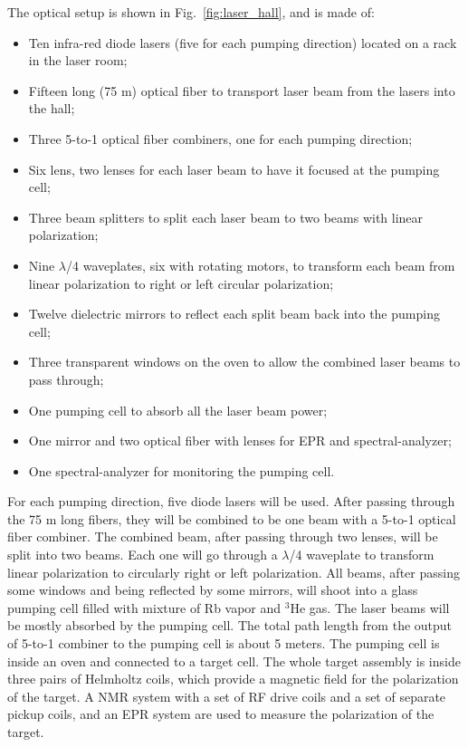 {The optical setup is shown in Fig.~\ref{fig:laser_hall}, and is made of:
\begin {itemize}
\item Ten infra-red diode lasers (five for each pumping direction) 
located on a rack in the laser room;
\item Fifteen long (75 m) optical fiber to transport laser beam from the lasers
into the hall;
\item Three 5-to-1 optical fiber combiners, one for each pumping direction;
\item Six lens, two lenses for each laser beam to have it focused at the 
pumping cell;
\item Three beam splitters to split each laser beam to two beams with linear polarization;
\item Nine $\lambda$/4 waveplates, six with rotating motors, to transform 
each beam from linear polarization to right or left circular polarization;
\item Twelve dielectric mirrors to reflect each split beam back into the pumping cell;
\item Three transparent windows 
on the oven to allow the combined laser beams to pass through;
\item One pumping cell to absorb all the laser beam power;
\item One mirror and two optical fiber with lenses for EPR and spectral-analyzer;
\item One spectral-analyzer for monitoring the pumping cell.
\end {itemize}

For each pumping direction, five diode lasers will be used. After passing through the 75 m long fibers, they will be combined
to be one beam with a 5-to-1 optical fiber combiner. The combined beam, after passing through two lenses,
will be split into two beams. Each one will go through a $\lambda$/4 waveplate
to transform linear polarization to circularly right or left polarization. 
All beams, after passing some windows and being reflected by some mirrors,  
will shoot into a glass pumping cell filled with
mixture of Rb vapor and $^3$He gas. The laser beams will be mostly absorbed
by the pumping cell. The total path length from the output of 5-to-1 combiner 
to the pumping cell
is about 5 meters. The pumping cell is inside an oven and 
connected to a target cell. The whole target assembly is inside three pairs of
Helmholtz coils, which provide a magnetic field for the polarization of the
target. A NMR system with a set of RF drive coils and a set of separate 
pickup coils, and an EPR system 
are used to measure the polarization of the target.


}
